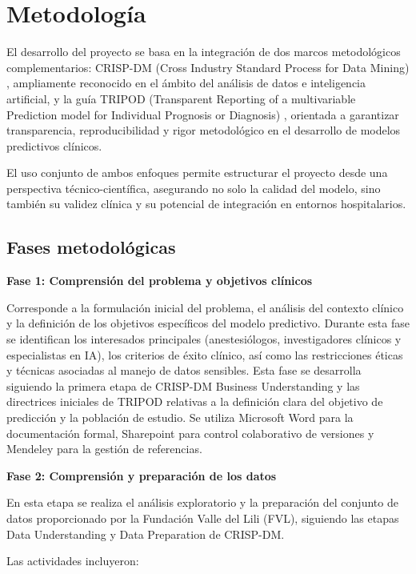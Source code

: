 \section{Metodología}

El desarrollo del proyecto se basa en la integración de dos marcos metodológicos complementarios: CRISP-DM (Cross Industry Standard Process for Data Mining) \cite{crispdm1999}, ampliamente reconocido en el ámbito del análisis de datos e inteligencia artificial, y la guía TRIPOD (Transparent Reporting of a multivariable Prediction model for Individual Prognosis or Diagnosis) \cite{collins2015}, orientada a garantizar transparencia, reproducibilidad y rigor metodológico en el desarrollo de modelos predictivos clínicos.

El uso conjunto de ambos enfoques permite estructurar el proyecto desde una perspectiva técnico-científica, asegurando no solo la calidad del modelo, sino también su validez clínica y su potencial de integración en entornos hospitalarios.

\subsection{Fases metodológicas}

\textbf{Fase 1: Comprensión del problema y objetivos clínicos}

Corresponde a la formulación inicial del problema, el análisis del contexto clínico y la definición de los objetivos específicos del modelo predictivo. Durante esta fase se identifican los interesados principales (anestesiólogos, investigadores clínicos y especialistas en IA), los criterios de éxito clínico, así como las restricciones éticas y técnicas asociadas al manejo de datos sensibles. Esta fase se desarrolla siguiendo la primera etapa de CRISP-DM Business Understanding y las directrices iniciales de TRIPOD relativas a la definición clara del objetivo de predicción y la población de estudio. Se utiliza Microsoft Word para la documentación formal, Sharepoint para control colaborativo de versiones y Mendeley para la gestión de referencias.

\textbf{Fase 2: Comprensión y preparación de los datos}

En esta etapa se realiza el análisis exploratorio y la preparación del conjunto de datos proporcionado por la Fundación Valle del Lili (FVL), siguiendo las etapas Data Understanding y Data Preparation de CRISP-DM.

Las actividades incluyeron:

